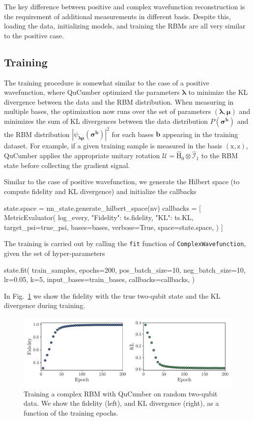 \documentclass[submission, Phys, hidelnks]{SciPost}
\begin{document}
The key difference between positive and complex wavefunction reconstruction is the requirement of additional measurements in different basis. Despite this, loading the data, initializing models, and training the RBMs are all very similar to the positive case.

\subsection{Training}
The training procedure is somewhat similar to the case of a positive wavefunction, where QuCumber optimized the parameters $\bm{\lambda}$ to minimize the KL divergence between the data and the RBM distribution. When measuring in multiple bases, the optimization now runs over the set of parameters $(\bm{\lambda},\bm{\mu})$ and minimizes the sum of KL divergences between the data distribution $P(\bm{\sigma}^{\bm{b}})$ and the RBM distribution $|\psi_{\bm{\lambda\mu}}(\bm{\sigma}^{\bm{b}})|^2$ for each bases $\bm{b}$ appearing in the training dataset. For example, if a given training sample is measured in the basis $(\mathrm{x},\mathrm{z})$, QuCumber applies the appropriate unitary rotation $\bm{\mathcal{U}}=\hat{\mathrm{H}}_0\otimes\hat{\mathcal{I}}_1$ to the RBM state before collecting the gradient signal. 

Similar to the case of positive wavefunction, we generate the Hilbert space (to compute fidelity and KL divergence) and initialize the callbacks
\begin{python}
state.space = nn_state.generate_hilbert_space(nv)
callbacks = [
  MetricEvaluator(
    log_every,
    {"Fidelity": ts.fidelity, "KL": ts.KL},
    target_psi=true_psi,
    bases=bases,
    verbose=True,
    space=state.space,
  )
]

\end{python}
The training is carried out by calling the \verb|fit| function of \verb|ComplexWavefunction|, given the set of hyper-parameters
\begin{python}
state.fit(
    train_samples,
    epochs=200,
    pos_batch_size=10,
    neg_batch_size=10,
    lr=0.05,
    k=5,
    input_bases=train_bases,
    callbacks=callbacks,
)
\end{python}

In Fig.~\ref{fig:complex} we show the fidelity with the true two-qubit state and the KL divergence during training. 
\begin{figure}[htb]
    \centering{}
    \includegraphics[width=\textwidth]{complex_fid_KL.pdf}
    \caption{\label{fig:complex} Training a complex RBM with QuCumber on random two-qubit data. We show the fidelity (left), and KL divergence (right), as a function of the training epochs.}
\end{figure}
\end{document}
